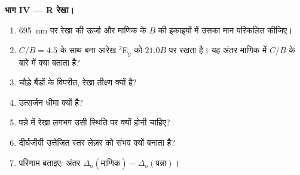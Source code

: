 \begin{problem}
\medskip\noindent\textbf{भाग IV --- R रेखा।}
\begin{enumerate}[resume]
  \item \qty{695}{nm} पर रेखा की ऊर्जा और माणिक के $B$ की इकाइयों में उसका मान परिकलित कीजिए।
  \item $C/B = 4.5$ के साथ बना आरेख $^2$E$_g$ को $21.0B$ पर रखता है। यह अंतर माणिक में
        $C/B$ के बारे में क्या बताता है?
  \item चौड़े बैंडों के विपरीत, रेखा तीक्ष्ण क्यों है?
  \item उत्सर्जन धीमा क्यों है?
  \item पन्ने में रेखा लगभग उसी स्थिति पर क्यों होनी चाहिए?
  \item दीर्घजीवी उत्तेजित स्तर लेज़र को संभव क्यों बनाता है?
  \item परिणाम बताइए: अंतर $\Delta_{\mathrm o}(\text{माणिक}) - \Delta_{\mathrm o}(\text{पन्ना})$।
\end{enumerate}
\end{problem}
